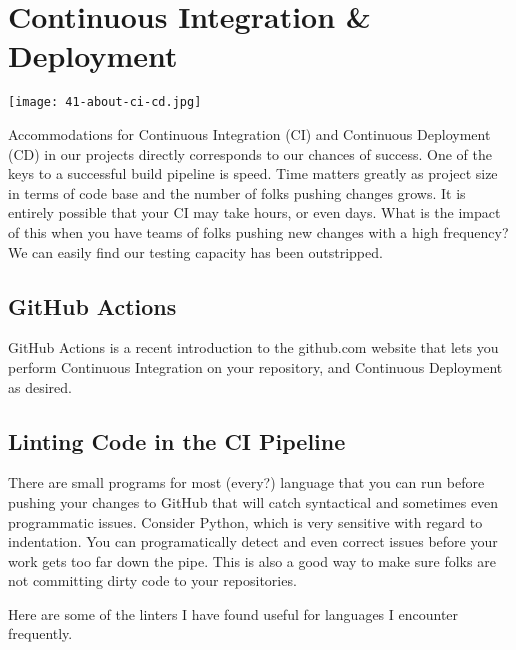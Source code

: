 \chapter{Continuous Integration \& Deployment}

\texttt{[image: 41-about-ci-cd.jpg]}

\justifying
Accommodations for Continuous Integration (CI) and Continuous Deployment (CD) in our projects directly
corresponds to our chances of success. One of the keys to a successful build pipeline is speed. Time
matters greatly as project size in terms of code base and the number of folks pushing changes grows. It
is entirely possible that your CI may take hours, or even days. What is the impact of this when you have
teams of folks pushing new changes with a high frequency? We can easily find our testing
capacity has been outstripped.

\section{GitHub Actions}

\justifying
GitHub Actions is a recent introduction to the github.com website that
lets you perform Continuous Integration on your repository, and Continuous
Deployment as desired.


\section{Linting Code in the CI Pipeline}

\justifying
There are small programs for most (every?) language that you can run before
pushing your changes to GitHub that will catch syntactical and sometimes
even programmatic issues. Consider Python, which is very sensitive with
regard to indentation. You can programatically detect and even correct issues
before your work gets too far down the pipe. This is also a good way to
make sure folks are not committing dirty code to your repositories.

\justifying
Here are some of the linters I have found useful for languages I encounter
frequently.

